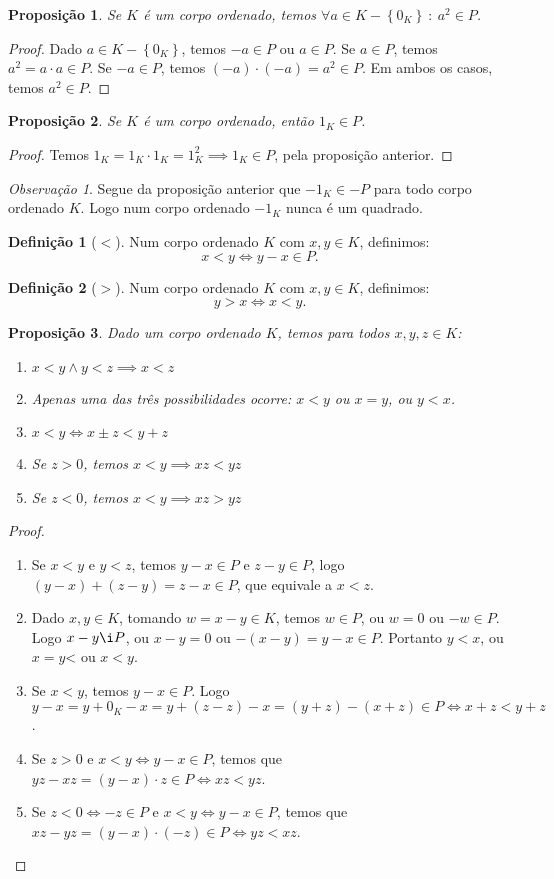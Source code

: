 \documentclass{article}
\theoremstyle{plain}
\newtheorem{prop}{Proposição}[section]
\theoremstyle{definition}
\newtheorem{definicao}{Definição}[section]
\theoremstyle{remark}
\newtheorem{obs}{Observação}[section]
\begin{document}
\begin{prop}
	Se $K$ é um corpo ordenado, temos $ \forall a\in K-\left\{0_K\right\}  \: : \: a^2 \in P$.
\end{prop}
\begin{proof}
	Dado $a\in K-\left\{0_K\right\}$, temos $-a \in P$  ou $a\in P$.  Se $a\in P$, temos $a^2 = a\cdot a \in P$. Se $-a\in P$, temos $(-a)\cdot (-a) = a^2 \in P$. Em ambos os casos, temos $a^2\in P$.
\end{proof}
\begin{prop}
	Se $K$ é um corpo ordenado, então $1_K \in P$.
\end{prop}
\begin{proof}
	Temos $1_K = 1_K \cdot 1_K  = 1_K^2 \implies 1_K \in P$, pela proposição anterior.
\end{proof}
\begin{obs}
	Segue da proposição anterior que $-1_K\in -P$ para todo corpo ordenado $K$. Logo num corpo ordenado $-1_K$ nunca é um quadrado.
\end{obs}
\begin{definicao}[$<$]
	Num corpo ordenado $K$ com $x,y \in K$, definimos:
	$$ x< y \iff y - x \in P.$$
\end{definicao}
\begin{definicao}[$>$]
	Num corpo ordenado $K$ com $x,y \in K$, definimos:
	$$ y> x \iff x < y.$$
\end{definicao}
\begin{prop}
	Dado um corpo ordenado $K$, temos para todos $x,y,z\in K$:
	\begin{enumerate}
		\item $ x <y \land y < z \implies x< z$
		\item Apenas uma das três possibilidades ocorre: $x < y$ ou $x = y$, ou $y < x$.
		\item $x < y \iff x\pm z < y+z$
		\item Se $z>0$, temos $ x< y \implies xz < yz$
		\item Se $z<0$, temos $ x< y \implies xz > yz$
	\end{enumerate}
\end{prop}
\begin{proof}
	\begin{enumerate}
		\item Se $x<y$  e $y<z$, temos $y-x\in P$ e $z-y \in P$, logo $(y-x) +(z-y) = z-x \in P$, que equivale a $x<z$.
		\item Dado $x,y\in K$, tomando $w = x-y \in K$, temos $w \in P$, ou $w = 0$ ou $-w \in P$. Logo $x-y \i P$, ou $x-y = 0$ ou $-(x-y) = y-x \in P$. Portanto $y <x$, ou $x = y$< ou $x<y$.
		\item Se $x<y$, temos $y-x\in P$. Logo $y-x = y+0_K -x  = y +(z-z) -x = (y+z) -(x+z) \in P \iff x+z < y +z$.
		\item Se $z>0$ e $x<y \iff y-x\in P$, temos que $ yz - xz = (y-x)\cdot z \in P \iff xz<yz$.
		\item Se $z<0 \iff -z \in P$ e $x<y \iff y-x\in P$, temos que $  xz - yz = (y-x)\cdot (-z) \in P \iff yz<xz$.
	\end{enumerate}
\end{proof}
\end{document}

